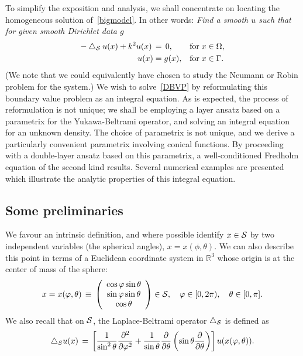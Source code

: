 To simplify the exposition and analysis, we shall concentrate on
locating the homogeneous solution of~\eqref{bigmodel}.  In other words:
{\it Find a smooth $u$ such that for given smooth Dirichlet data $g$}
\begin{subequations}
  \label{DBVP}
  \begin{align}
    -\lap_{\S} u(x) +k^2u(x)\, &= \, 0, &&\mbox{for} \; 
      x \in { \Omega},\\
    u(x) &= g(x), &&\mbox{for} \; x \in \Gamma.
  \end{align}
\end{subequations}
(We note that we could equivalently have chosen to study the Neumann or
Robin problem for the system.)  We wish to solve~\eqref{DBVP} by
reformulating this boundary value problem as an integral equation. As is
expected, the process of reformulation is not unique; we shall be
employing a layer ansatz based on a parametrix for the Yukawa-Beltrami
operator, and solving an integral equation for an unknown density.  The
choice of parametrix is not unique, and we derive a particularly
convenient parametrix involving conical functions. By proceeding with a
double-layer ansatz based on this parametrix,  a well-conditioned
Fredholm equation of the second kind results. Several numerical examples
are presented which illustrate the analytic properties of this integral
equation.


\subsection{Some preliminaries}
 We favour an intrinsic definition, and where possible identify $x\in \S$ by two independent variables (the spherical angles), $x=x(\phi,\theta)$. We can also describe this point in terms of a Euclidean coordinate system in $\mathbb{R}^3$ whose origin is at the center of mass of the sphere: 
\begin{align*}
 x= x(\varphi,\theta) \, \equiv \, \left( 
  \begin{array}{c}
    \cos \varphi \sin \theta \\
    \sin \varphi \sin \theta \\
    \cos \theta
  \end{array} 
  \right) \in{\S}, \quad \varphi \in [0,2\pi), 
    \quad \theta \in [0,\pi].
\end{align*}
We also recall that on $\S$, the Laplace-Beltrami operator  $\lap_\S$
is defined as
\begin{align*}
  \lap_S u(x) \, = \, \left[
  \frac{1}{\sin^2 \theta} \frac{\partial^2}{\partial \varphi^2} +
  \frac{1}{\sin \theta} \frac{\partial}{\partial \theta}
  \left(\sin \theta \frac{\partial}{ \partial \theta}\right)
  \right] u(x(\varphi,\theta)).
\end{align*}

